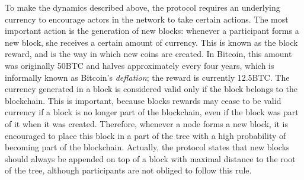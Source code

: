 To make the dynamics described above, the protocol requires an underlying currency to encourage actors in the network to take certain actions. The most important action is 
the generation of new blocks: whenever a participant forms a new block, she receives a certain amount of currency. This is known as the block reward, and is the way in which new coins are created. In Bitcoin, this amount was originally 50BTC and halves approximately every four years, which is informally known as Bitcoin's \emph{deflation}; the reward is currently 12.5BTC. The currency generated in a block is considered valid only if the block belongs to the blockchain. This is important, because blocks rewards may cease to be 
valid currency if a block is no longer part of the blockchain, even if the block was part of it when it was created. 
Therefore, whenever a node forms a new block, it is encouraged to place this block in a part of the tree with a high probability of becoming part of the blockchain. Actually, the protocol states that new blocks should always be appended on top of a block with maximal distance to the root of the tree, although participants are not obliged to follow this rule.


